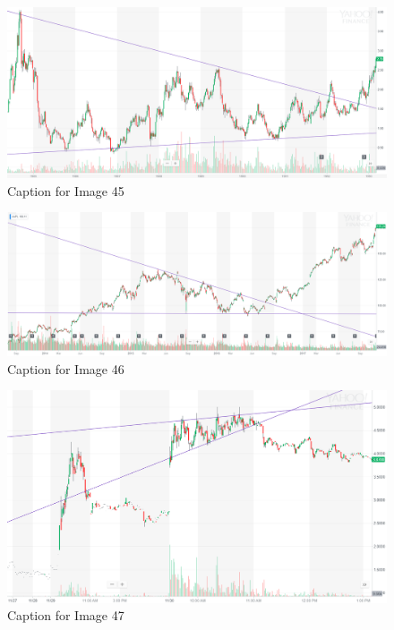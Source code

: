 \documentclass{article}
\begin{document}
\vspace{10pt}

\begin{figure}[!htb]
    \centering
    \includegraphics[width=\textwidth]{imgs/45.png}
    \caption{Caption for Image 45}
\end{figure}

\vspace{10pt}

\begin{figure}[!htb]
    \centering
    \includegraphics[width=\textwidth]{imgs/46.png}
    \caption{Caption for Image 46}
\end{figure}

\vspace{10pt}

\begin{figure}[!htb]
    \centering
    \includegraphics[width=\textwidth]{imgs/47.png}
    \caption{Caption for Image 47}
\end{figure}
\end{document}
